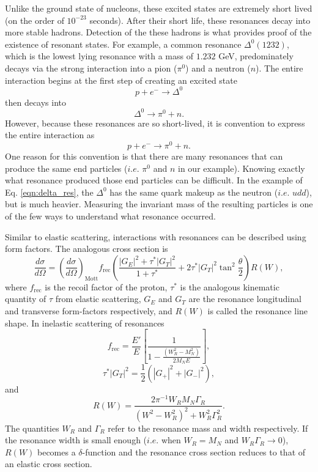 Unlike the ground state of nucleons, these excited states are extremely short lived (on the order of $10^{-23}$ seconds). After their short life, these resonances decay into more stable hadrons. Detection of the these hadrons is what provides proof of the existence of resonant states. For example, a common resonance $\Delta^0(1232)$, which is the lowest lying resonance with a mass of $1.232$ GeV, predominately decays via the strong interaction into a pion ($\pi^0$) and a neutron ($n$). The entire interaction begins at the first step of creating an excited state
\begin{equation}
p+e^- \longrightarrow \Delta^0
\end{equation}
then decays into
\begin{equation}
\Delta^0 \longrightarrow \pi^0 + n.
\end{equation}
However, because these resonances are so short-lived, it is convention to express the entire interaction as
\begin{equation}
\label{eqn:delta_res}
p+e^- \longrightarrow \pi^0 + n.
\end{equation}
One reason for this convention is that there are many resonances that can produce the same end particles ($i.e.$ $\pi^0$ and $n$ in our example). Knowing exactly what resonance produced those end particles can be difficult. In the example of Eq. \ref{eqn:delta_res}, the $\Delta^0$ has the same quark makeup as the neutron ($i.e.$ $udd$), but is much heavier. Measuring the invariant mass of the resulting particles is one of the few ways to understand what resonance occurred. 

Similar to elastic scattering, interactions with resonances can be described using form factors. The analogous cross section is
\begin{equation}
\frac{d\sigma}{d\Omega} = \left( \frac{d\sigma}{d\Omega} \right)_{\mathrm{Mott}} f_{\mathrm{rec}} \left( \frac{|G_E|^2+\tau^*|G_T|^2}{1+\tau^*} + 2\tau^* |G_T|^2 \tan^2 \frac{\theta}{2} \right) R(W),
\end{equation}
where $f_{\mathrm{rec}}$ is the recoil factor of the proton, $\tau^*$ is the analogous kinematic quantity of $\tau$ from elastic scattering, $G_E$ and $G_T$ are the resonance longitudinal and transverse form-factors respectively, and $R(W)$ is called the resonance line shape. In inelastic scattering of resonances
\begin{equation}
f_{\mathrm{rec}} = \frac{E'}{E} \left[ \frac{1}{1-\frac{(W_R^2 - M_N^2)}{2M_NE}} \right],
\end{equation}
\begin{equation}
\tau^* |G_T|^2 = \frac{1}{2}(|G_+|^2 + |G_-|^2),
\end{equation}
and
\begin{equation}
R(W) = \frac{2\pi^{-1}W_R M_N \Gamma_R}{(W^2-W_R^2)^2 + W_R^2 \Gamma_R^2}.
\end{equation}
The quantities $W_R$ and $\Gamma_R$ refer to the resonance mass and width respectively. If the resonance width is small enough ($i.e.$ when $W_R=M_N$ and $W_R \Gamma_R \rightarrow 0$), $R(W)$ becomes a $\delta$-function and the resonance cross section reduces to that of an elastic cross section. 

